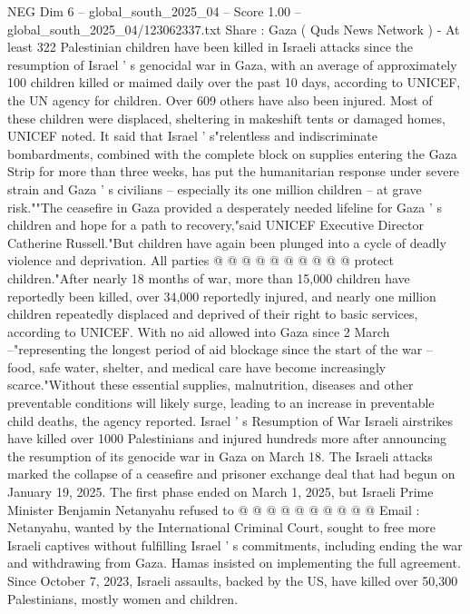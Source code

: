 \begin{textsample}{NEG Dim 6 – global\_south\_2025\_04 – Score 1.00 – global\_south\_2025\_04/123062337.txt}  \label{ex:f6_neg_211}
Share : Gaza ( Quds News Network ) - At least 322 Palestinian children have been killed in Israeli attacks since the resumption of Israel ' s genocidal war in Gaza, with an average of approximately 100 children killed or maimed daily over the past 10 days, according to UNICEF, the UN agency for children.
Over 609 others have also been injured.
Most of these children were displaced, sheltering in makeshift tents or damaged homes, UNICEF noted.
It said that Israel ' s"relentless and indiscriminate bombardments, combined with the complete block on supplies entering the Gaza Strip for more than three weeks, has put the humanitarian response under severe strain and Gaza ' s civilians -- especially its one million children -- at grave risk.""The ceasefire in Gaza provided a desperately needed lifeline for Gaza ' s children and hope for a path to recovery,"said UNICEF Executive Director Catherine Russell."But children have again been plunged into a cycle of deadly violence and deprivation.
All parties @ @ @ @ @ @ @ @ @ @ protect children."After nearly 18 months of war, more than 15,000 children have reportedly been killed, over 34,000 reportedly injured, and nearly one million children repeatedly displaced and deprived of their right to basic services, according to UNICEF.
With no aid allowed into Gaza since 2 March --"representing the longest period of aid blockage since the start of the war -- food, safe water, shelter, and medical care have become increasingly scarce."Without these essential supplies, malnutrition, diseases and other preventable conditions will likely surge, leading to an increase in preventable child deaths, the agency reported.
Israel ' s Resumption of War Israeli airstrikes have killed over 1000 Palestinians and injured hundreds more after announcing the resumption of its genocide war in Gaza on March 18.
The Israeli attacks marked the collapse of a ceasefire and prisoner exchange deal that had begun on January 19, 2025.
The first phase ended on March 1, 2025, but Israeli Prime Minister Benjamin Netanyahu refused to @ @ @ @ @ @ @ @ @ @ Email : Netanyahu, wanted by the International Criminal Court, sought to free more Israeli captives without fulfilling Israel ' s commitments, including ending the war and withdrawing from Gaza.
Hamas insisted on implementing the full agreement.
Since October 7, 2023, Israeli assaults, backed by the US, have killed over 50,300 Palestinians, mostly women and children.

\end{textsample}

